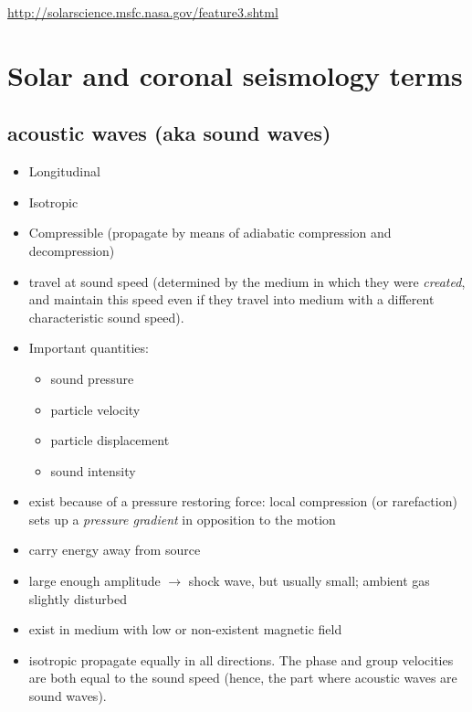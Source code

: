 \documentclass{article}
\begin{document}
\tableofcontents
\url{http://solarscience.msfc.nasa.gov/feature3.shtml}

\newpage

\hypersetup{linkcolor=darkpowderblue}

\section{Solar and coronal seismology terms}
\subsection{acoustic waves (aka sound waves)}
\begin{itemize}
    \item Longitudinal
    \item Isotropic
    \item Compressible (propagate by means of adiabatic
        compression and decompression)
    \item travel at sound speed (determined by the medium in which
        they were \emph{created}, and maintain this speed even if they
        travel into medium with a different characteristic sound speed).
    \item Important quantities:
        \begin{itemize}
            \item sound pressure
            \item particle velocity
            \item particle displacement
            \item sound intensity
        \end{itemize}
    \item exist because of a pressure restoring force: local compression
        (or rarefaction) sets up a \emph{pressure gradient} in opposition
        to the motion
    \item carry energy away from source
    \item large enough amplitude $\rightarrow$ shock wave,
        but usually small; ambient gas slightly disturbed
    \item exist in medium with low or non-existent magnetic field
    \item isotropic \- propagate equally in all directions. The phase
        and group velocities are both equal to the sound speed (hence, the
        part where acoustic waves are sound waves).
\end{itemize}
\end{document}
